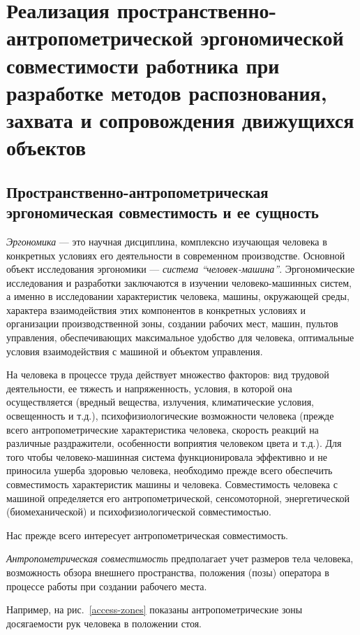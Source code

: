 \section{Реализация пространственно\hyp{}антропометрической эргономической совместимости работника при разработке методов распознования, захвата и сопровождения движущихся объектов}

\subsection{Пространственно-антропометрическая эргономическая совместимость и ее сущность}
\emph{Эргономика} --- это научная дисциплина, комплексно изучающая человека в конкретных условиях его деятельности в современном производстве. Основной объект исследования эргономики --- \emph{система ``человек\hyp{}машина''}. Эргономические исследования и разработки заключаются в изучении человеко-машинных систем, а именно в исследовании характеристик человека, машины, окружающей среды, характера взаимодействия этих компонентов в конкретных условиях и организации производственной зоны, создании рабочих мест, машин, пультов управления, обеспечивающих максимальное удобство для человека, оптимальные условия взаимодействия с машиной и объектом управления.\cite{devisilov09}

На человека в процессе труда действует множество факторов: вид трудовой деятельности, ее тяжесть и напряженность, условия, в которой она осуществляется (вредный вещества, излучения, климатические условия, освещенность и т.д.), психофизиологические возможности человека (прежде всего антропометрические характеристика человека, скорость реакций на различные раздражители, особенности воприятия человеком цвета и т.д.). Для того чтобы человеко-машинная система функционировала эффективно и не приносила ушерба здоровью человека, необходимо прежде всего обеспечить совместимость характеристик машины и человека. Совместимость человека с машиной определяется его антропометрической, сенсомоторной, энергетической (биомеханической) и психофизиологической совместимостью.\cite{devisilov09}

Нас прежде всего интересует антропометрическая совместимость.

\emph{Антропометрическая совместимость} предполагает учет размеров тела человека, возможность обзора внешнего пространства, положения (позы) оператора в процессе работы при создании рабочего места.\cite{devisilov09}

Например, на рис.~\ref{access-zones} показаны антропометрические зоны досягаемости рук человека в положении стоя.

